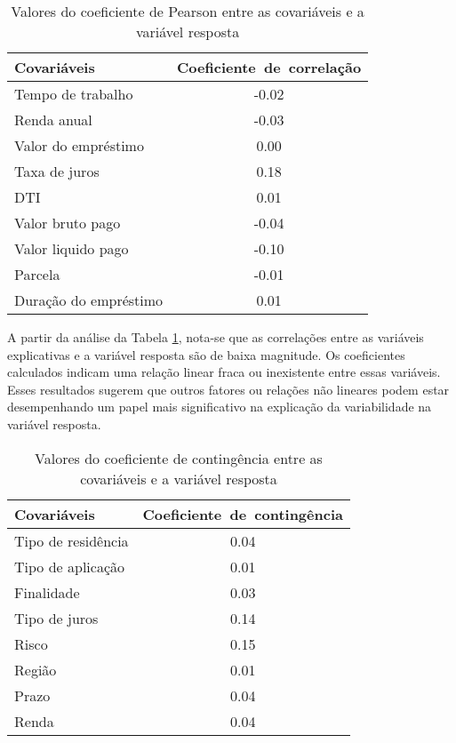 \begin{table}[H]
  \centering
  \begin{tabular}{lc}
    \hline
    \textbf{Covariáveis} & \mbox{\textbf{Coeficiente de correlação}} \\ 
    \hline
    Tempo de trabalho & -0.02 \\ 
    Renda anual & -0.03 \\ 
    Valor do empréstimo & 0.00 \\ 
    Taxa de juros & 0.18 \\ 
    DTI & 0.01 \\ 
    Valor bruto pago & -0.04 \\ 
    Valor liquido pago & -0.10 \\ 
    Parcela & -0.01 \\ 
    Duração do empréstimo &  0.01 \\
    \hline
  \end{tabular}
  \caption{Valores do coeficiente de Pearson entre as covariáveis e a variável resposta}
  \label{tab:coef_corr}
  \end{table}

A partir da análise da Tabela \ref{tab:coef_corr}, nota-se que as correlações entre as 
variáveis explicativas e a variável resposta são de baixa magnitude. Os coeficientes 
calculados indicam uma relação linear fraca ou inexistente entre essas variáveis. 
Esses resultados sugerem que outros fatores ou relações não lineares podem estar desempenhando 
um papel mais significativo na explicação da variabilidade na variável resposta.
  
\begin{table}[H]
  \centering
  \begin{tabular}{lc}
    \hline
    \textbf{Covariáveis} & \mbox{\textbf{Coeficiente de contingência}} \\ 
    \hline
    Tipo de residência & 0.04 \\ 
    Tipo de aplicação & 0.01 \\ 
    Finalidade & 0.03 \\ 
    Tipo de juros & 0.14 \\ 
    Risco & 0.15 \\ 
    Região & 0.01 \\ 
    Prazo & 0.04 \\
    Renda &  0.04 \\
     \hline
  \end{tabular}
  \caption{Valores do coeficiente de contingência entre as covariáveis e a variável resposta}
  \label{tab:coef_cont}
\end{table}

